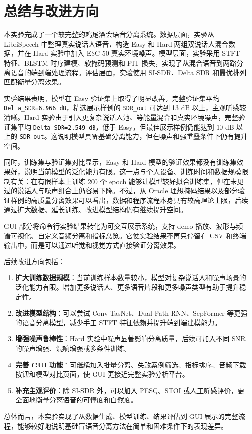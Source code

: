 \section{总结与改进方向}

本实验完成了一个较完整的鸡尾酒会语音分离系统。数据层面，实验从 LibriSpeech 中整理真实说话人语音，构造 Easy 和 Hard 两组双说话人混合数据，并在 Hard 实验中加入 ESC-50 真实环境噪声。模型层面，实验采用 STFT 特征、BLSTM 时序建模、软掩码预测和 PIT 损失，实现了从混合语音到两路分离语音的端到端处理流程。评估层面，实验使用 SI-SDR、Delta SDR 和最优排列匹配衡量分离效果。

实验结果表明，模型在 Easy 验证集上取得了明显改善，完整验证集平均 \texttt{Delta\_SDR=6.966 dB}，精选展示样例的 \texttt{SDR\_out} 可达到 13 dB 以上，主观听感较清晰。Hard 实验由于引入更复杂说话人池、等能量混合和真实环境噪声，完整验证集平均 \texttt{Delta\_SDR=2.549 dB}，低于 Easy，但最佳展示样例仍能达到 10 dB 以上的 \texttt{SDR\_out}。这说明模型具备基础分离能力，但在噪声和强重叠条件下仍有提升空间。

同时，训练集与验证集对比显示，Easy 和 Hard 模型的验证效果都没有训练集效果好，说明当前模型的泛化能力有限。这一点与个人设备、训练时间和数据规模限制有关：在有限样本上训练 200 个 epoch 能够让模型较好拟合训练集，但在未见过的说话人与噪声组合上仍容易下降。不过，从 Oracle 理想掩码结果以及部分验证样例的高质量分离效果可以看出，数据和程序流程本身具有较高理论上限，后续通过扩大数据、延长训练、改进模型结构仍有继续提升空间。

GUI 部分将命令行实验结果转化为可交互展示系统，支持 demo 播放、波形与频谱可视化、自定义音频分离和指标总览。它使实验结果不再只停留在 CSV 和终端输出中，而是可以通过听觉和视觉方式直接验证分离效果。

后续改进方向包括：

\begin{enumerate}
    \item \textbf{扩大训练数据规模}：当前训练样本数量较小，模型对复杂说话人和噪声场景的泛化能力有限。增加更多说话人、更多语音片段和更多噪声类型有助于提升稳定性。
    \item \textbf{改进模型结构}：可以尝试 Conv-TasNet、Dual-Path RNN、SepFormer 等更强的语音分离模型，减少手工 STFT 特征依赖并提升端到端建模能力。
    \item \textbf{增强噪声鲁棒性}：Hard 实验中噪声显著影响分离质量，后续可加入不同 SNR 的噪声增强、混响增强或多条件训练。
    \item \textbf{完善 GUI 功能}：可继续加入批量分离、失败案例筛选、指标排序、音频下载按钮和模型对比页面，使 GUI 更接近完整实验分析平台。
    \item \textbf{补充主观评价}：除 SI-SDR 外，可以加入 PESQ、STOI 或人工听感评价，更全面地衡量分离语音的可懂度和自然度。
\end{enumerate}

总体而言，本实验实现了从数据生成、模型训练、结果评估到 GUI 展示的完整流程，能够较好地说明基础盲语音分离方法在简单和困难条件下的表现差异。
